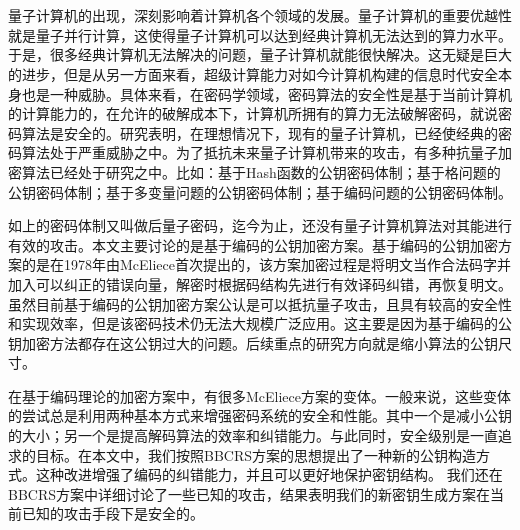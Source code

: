 \vspace{-2.5cm}
\chapter*{}
\vspace{-1cm}
量子计算机的出现，深刻影响着计算机各个领域的发展。量子计算机的重要优越性就是量子并行计算，这使得量子计算机可以达到经典计算机无法达到的算力水平。于是，很多经典计算机无法解决的问题，量子计算机就能很快解决。这无疑是巨大的进步，但是从另一方面来看，超级计算能力对如今计算机构建的信息时代安全本身也是一种威胁。具体来看，在密码学领域，密码算法的安全性是基于当前计算机的计算能力的，在允许的破解成本下，计算机所拥有的算力无法破解密码，就说密码算法是安全的。研究表明，在理想情况下，现有的量子计算机，已经使经典的密码算法处于严重威胁之中。为了抵抗未来量子计算机带来的攻击，有多种抗量子加密算法已经处于研究之中。比如：基于Hash函数的公钥密码体制；基于格问题的公钥密码体制；基于多变量问题的公钥密码体制；基于编码问题的公钥密码体制。

如上的密码体制又叫做后量子密码，迄今为止，还没有量子计算机算法对其能进行有效的攻击。本文主要讨论的是基于编码的公钥加密方案。基于编码的公钥加密方案的是在1978年由McEliece首次提出的\cite{Mceliece1978A}，该方案加密过程是将明文当作合法码字并加入可以纠正的错误向量，解密时根据码结构先进行有效译码纠错，再恢复明文。虽然目前基于编码的公钥加密方案公认是可以抵抗量子攻击，且具有较高的安全性和实现效率，但是该密码技术仍无法大规模广泛应用。这主要是因为基于编码的公钥加密方法都存在这公钥过大的问题。后续重点的研究方向就是缩小算法的公钥尺寸。

在基于编码理论的加密方案中，有很多McEliece方案的变体\cite{Loidreau2001Weak, Berger2009Reducing}。一般来说，这些变体的尝试总是利用两种基本方式来增强密码系统的安全和性能。其中一个是减小公钥的大小；另一个是提高解码算法的效率和纠错能力。与此同时，安全级别是一直追求的目标。在本文中，我们按照BBCRS方案\cite{Baldi2011EnhancedPK}的思想提出了一种新的公钥构造方式。这种改进增强了编码的纠错能力，并且可以更好地保护密钥结构。 我们还在BBCRS方案中详细讨论了一些已知的攻击，结果表明我们的新密钥生成方案在当前已知的攻击手段下是安全的。


\hspace{-0.5cm}
 
